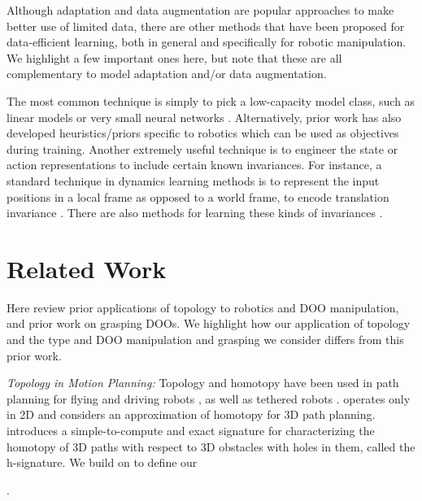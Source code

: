  Although adaptation and data augmentation are popular approaches to make better use of limited data, there are other methods that have been proposed for data-efficient learning, both in general and specifically for robotic manipulation. We highlight a few important ones here, but note that these are all complementary to model adaptation and/or data augmentation.

The most common technique is simply to pick a low-capacity model class, such as linear models or very small neural networks \cite{LinearAlarcon2013,TAMPC2021}. Alternatively, prior work has also developed heuristics/priors specific to robotics \cite{RoboticPriors2015} which can be used as objectives during training. Another extremely useful technique is to engineer the state or action representations to include certain known invariances. For instance, a standard technique in dynamics learning methods is to represent the input positions in a local frame as opposed to a world frame, to encode translation invariance \cite{Propnet,EquivariantTransporter2022,ZhuEquivariant2022}. There are also methods for learning these kinds of invariances \cite{TAMPC2021}. 


\section{Related Work}
\label{Proposed:sec:related_work}

Here review prior applications of topology to robotics and DOO manipulation, and prior work on grasping DOOs. We highlight how our application of topology and the type and DOO manipulation and grasping we consider differs from this prior work.

\textit{Topology in Motion Planning:}
Topology and homotopy have been used in path planning for flying and driving robots \cite{Bhattacharya11,Bhattacharya12}, as well as tethered robots \cite{TetherHomotopy}. \cite{TetherHomotopy} operates only in 2D and \cite{PDR_Jaillet} considers an approximation of homotopy for 3D path planning. \cite{Bhattacharya11} introduces a simple-to-compute and exact signature for characterizing the homotopy of 3D paths with respect to 3D obstacles with holes in them, called the h-signature. We build on \cite{Bhattacharya11} to define our \signature{}.

